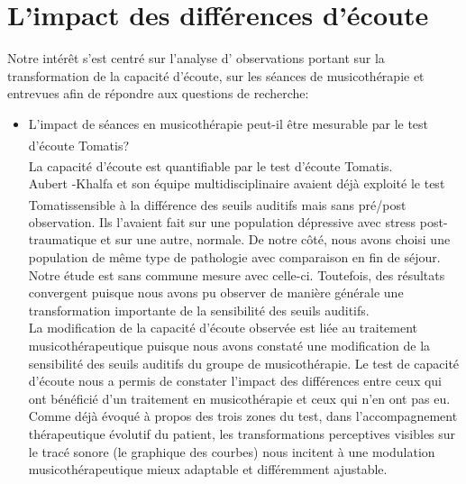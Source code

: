   \section{ L'impact des différences d'écoute }
 Notre intérêt s'est centré sur l'analyse d'
 	observations
 portant sur la transformation de la capacité d'écoute, sur les séances de musicothérapie et entrevues  
 afin de répondre aux questions de recherche: 
  \begin{itemize}
       \item L'impact de séances en musicothérapie  peut-il être mesurable par le test 
       d'écoute Tomatis\textsuperscript \textregistered?
        \\
          La capacité d'écoute est quantifiable  par le test d'écoute Tomatis.\textsuperscript \textregistered
  \\
  Aubert -Khalfa et son équipe multidisciplinaire \autocite{affectiveDisorders} avaient déjà
  exploité le test Tomatis\textsuperscript \textregistered    sensible à la différence des
  seuils auditifs mais sans pré/post observation. Ils l'avaient fait sur une population
  dépressive avec stress post-traumatique et sur une autre, normale. De notre côté, nous avons choisi
  une population de même type de pathologie avec comparaison en fin de séjour.
  Notre étude est sans commune mesure avec celle-ci. Toutefois, 
  des résultats convergent puisque nous avons pu observer de manière générale  une transformation 
  importante de la sensibilité des seuils auditifs. 
  \\
  	La modification de la capacité d'écoute observée est liée
 au traitement musicothérapeutique 
  puisque nous avons constaté une modification de la  
 sensibilité des 
 seuils auditifs du groupe de musicothérapie.
Le test de capacité d'écoute nous a permis de constater l'impact des différences  entre ceux qui ont 
bénéficié d'un 
 traitement en  musicothérapie et ceux qui n'en ont pas eu.
  \\
  Comme déjà évoqué à propos des trois zones du test, 
 dans l'accompagnement thérapeutique évolutif du patient,
 les transformations perceptives visibles sur
 le tracé sonore (le graphique des courbes) nous incitent à une modulation
 musicothérapeutique mieux adaptable et différemment ajustable.

\end{itemize}
